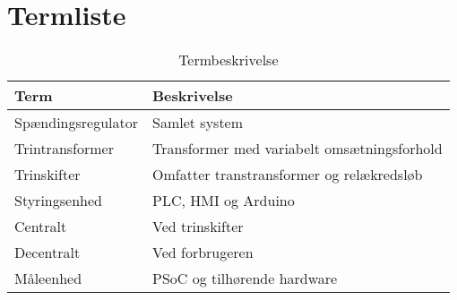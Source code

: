 

\chapter{Termliste}

\begin{table}[htbp]
	\centering
	\begin{tabular}{|l|l|}
		\hline
		\textbf{Term} 	& \textbf{Beskrivelse} \\\hline
		Spændingsregulator	& Samlet system \\\hline
		Trintransformer	& Transformer med variabelt omsætningsforhold \\\hline
		Trinskifter	& Omfatter transtransformer og relækredsløb  \\\hline
		Styringsenhed	& PLC, HMI og Arduino \\\hline
		Centralt	& Ved trinskifter \\\hline
		Decentralt 	& Ved forbrugeren \\\hline
		Måleenhed	& PSoC og tilhørende hardware \\\hline
		
	\end{tabular}
	\caption{Termbeskrivelse}
	\label{tab:termbeskrivelsen}
	
\end{table}